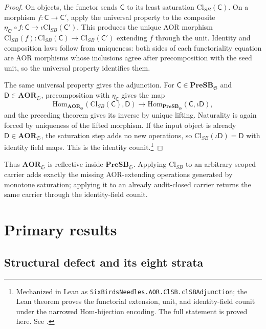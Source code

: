 \documentclass[11pt]{article}
\newcommand{\PreSB}{\mathbf{PreSB}}
\newcommand{\AOR}{\mathbf{AOR}}
\newcommand{\ClSB}{\mathrm{Cl}_{SB}}
\theoremstyle{definition}
\begin{document}
\begin{proof}
On objects, the functor sends \(\mathsf C\) to its least saturation
\(\ClSB(\mathsf C)\).  On a morphism \(f:\mathsf C\to\mathsf C'\), apply
the universal property to the composite
\(\eta_{\mathsf C'}\circ f:\mathsf C\to \iota\ClSB(\mathsf C')\).  This
produces the unique AOR morphism
\(\ClSB(f):\ClSB(\mathsf C)\to\ClSB(\mathsf C')\) extending \(f\) through
the unit.  Identity and composition laws follow from uniqueness: both sides
of each functoriality equation are AOR morphisms whose inclusions agree
after precomposition with the seed unit, so the universal property identifies
them.

The same universal property gives the adjunction.  For
\(\mathsf C\in\PreSB_{\mathfrak S}\) and
\(\mathsf D\in\AOR_{\mathfrak S}\), precomposition with
\(\eta_{\mathsf C}\) gives the map
\[
  \mathrm{Hom}_{\AOR_{\mathfrak S}}(\ClSB(\mathsf C),\mathsf D)
  \longrightarrow
  \mathrm{Hom}_{\PreSB_{\mathfrak S}}(\mathsf C,\iota\mathsf D),
\]
and the preceding theorem gives its inverse by unique lifting.  Naturality
is again forced by uniqueness of the lifted morphism.  If the input object is
already \(\mathsf D\in\AOR_{\mathfrak S}\), the saturation step adds no new
operations, so \(\ClSB(\iota\mathsf D)=\mathsf D\) with identity field maps.
This is the identity counit.\footnote{Mechanized in Lean as \texttt{SixBirdsNeedles.AOR.ClSB.clSBAdjunction}; the Lean theorem proves the functorial extension, unit, and identity-field counit under the narrowed Hom-bijection encoding. The full statement is proved here. See .}
\end{proof}

Thus \(\AOR_{\mathfrak S}\) is reflective inside
\(\PreSB_{\mathfrak S}\).  Applying \(\ClSB\) to an arbitrary scoped carrier
adds exactly the missing AOR-extending operations generated by monotone
saturation; applying it to an already audit-closed carrier returns the same
carrier through the identity-field counit.
 \section{Primary results}\label{sec:aor-primary-results}

\subsection{Structural defect and its eight strata}\label{sec:aor-primary-results-defect}
\end{document}
